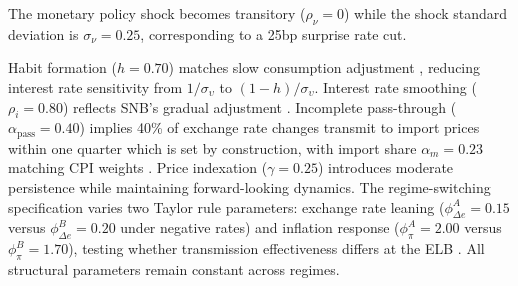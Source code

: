 \documentclass[12pt,a4paper]{article}
\begin{document}
The monetary policy shock becomes transitory ($\rho_\nu = 0$) while the shock standard deviation is $\sigma_\nu = 0.25$, corresponding to a 25bp surprise rate cut.

Habit formation ($h = 0.70$) matches slow consumption adjustment \citep{rudolf2014}, reducing interest rate sensitivity from $1/\sigma_\upsilon$ to $(1-h)/\sigma_\upsilon$. Interest rate smoothing ($\rho_i = 0.80$) reflects SNB's gradual adjustment \citep{cuchecurti2009}. Incomplete pass-through ($\alpha_{\text{pass}} = 0.40$) implies 40\% of exchange rate changes transmit to import prices within one quarter which is set by construction, with import share $\alpha_m = 0.23$ matching CPI weights \citep{rudolf2014}. Price indexation ($\gamma = 0.25$) introduces moderate persistence while maintaining forward-looking dynamics. The regime-switching specification varies two Taylor rule parameters: exchange rate leaning ($\phi_{\Delta e}^A = 0.15$ versus $\phi_{\Delta e}^B = 0.20$ under negative rates) and inflation response ($\phi_\pi^A = 2.00$ versus $\phi_\pi^B = 1.70$), testing whether transmission effectiveness differs at the ELB \citep{baumann2025, baurle2014}. All structural parameters remain constant across regimes.
\end{document}
